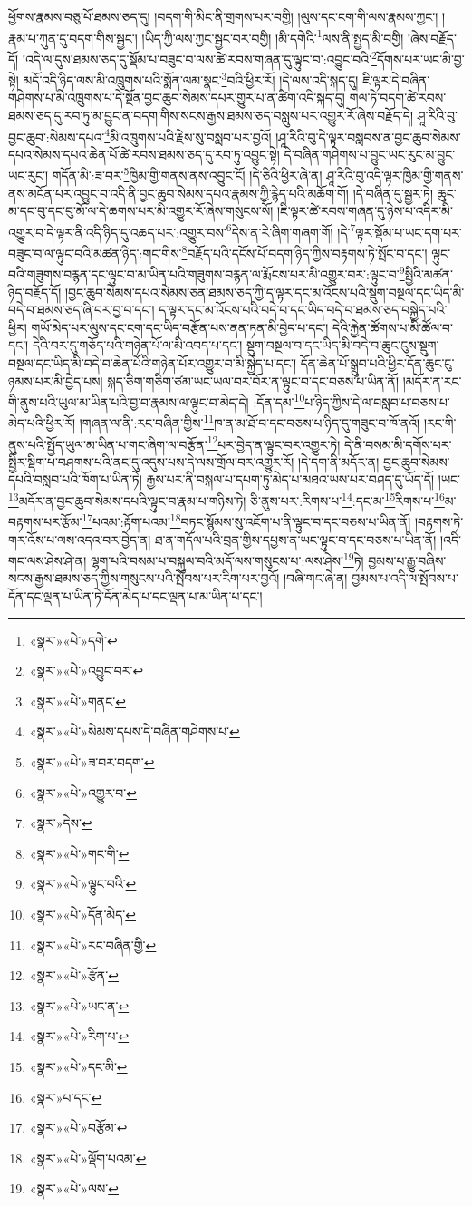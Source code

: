 ཕྱོགས་རྣམས་བཅུ་པོ་ཐམས་ཅད་དུ། །བདག་གི་མིང་ནི་གྲགས་པར་བགྱི། །ལུས་དང་ངག་གི་ལས་རྣམས་ཀྱང་། །རྣམ་པ་ཀུན་དུ་བདག་གིས་སྦྱང་། །ཡིད་ཀྱི་ལས་ཀྱང་སྦྱང་བར་བགྱི། །མི་དགེའི་\footnote{«སྣར་»«པེ་»དགེ་}ལས་ནི་སྤྱད་མི་བགྱི། །ཞེས་བརྗོད་དོ། །འདི་ལ་དུས་ཐམས་ཅད་དུ་སྡོམ་པ་བཟུང་བ་ལས་ཚེ་རབས་གཞན་དུ་ལྟུང་བ་:འབྱུང་བའི་\footnote{«སྣར་»«པེ་»འབྱུང་བར་}དོགས་པར་ཡང་མི་བྱ་སྟེ། མདོ་འདི་ཉིད་ལས་མི་འཁྲུགས་པའི་སྨོན་ལམ་སྣང་\footnote{«སྣར་»«པེ་»གནང་}བའི་ཕྱིར་རོ། །དེ་ལས་འདི་སྐད་དུ། ཇི་ལྟར་དེ་བཞིན་གཤེགས་པ་མི་འཁྲུགས་པ་དེ་སྔོན་བྱང་ཆུབ་སེམས་དཔར་གྱུར་པ་ན་ཚིག་འདི་སྐད་དུ། གལ་ཏེ་བདག་ཚེ་རབས་ཐམས་ཅད་དུ་རབ་ཏུ་མ་བྱུང་ན་བདག་གིས་སངས་རྒྱས་ཐམས་ཅད་བསླུས་པར་འགྱུར་རོ་ཞེས་བརྗོད་དེ། ཤཱ་རིའི་བུ་བྱང་ཆུབ་:སེམས་དཔའ་\footnote{«སྣར་»«པེ་»སེམས་དཔས་དེ་བཞིན་གཤེགས་པ་}མི་འཁྲུགས་པའི་རྗེས་སུ་བསླབ་པར་བྱའོ། །ཤཱ་རིའི་བུ་དེ་ལྟར་བསླབས་ན་བྱང་ཆུབ་སེམས་དཔའ་སེམས་དཔའ་ཆེན་པོ་ཚེ་རབས་ཐམས་ཅད་དུ་རབ་ཏུ་འབྱུང་སྟེ། དེ་བཞིན་གཤེགས་པ་བྱུང་ཡང་རུང་མ་བྱུང་ཡང་རུང་། གདོན་མི་:ཟ་བར་\footnote{«སྣར་»«པེ་»ཟ་བར་བདག་}ཁྱིམ་གྱི་གནས་ནས་འབྱུང་ངོ། །དེ་ཅིའི་ཕྱིར་ཞེ་ན། ཤཱ་རིའི་བུ་འདི་ལྟར་ཁྱིམ་གྱི་གནས་ནས་མངོན་པར་འབྱུང་བ་འདི་ནི་བྱང་ཆུབ་སེམས་དཔའ་རྣམས་ཀྱི་རྙེད་པའི་མཆོག་གོ། །དེ་བཞིན་དུ་སྦྱར་ཏེ། ཆུང་མ་དང་བུ་དང་བུ་མོ་ལ་དེ་ཆགས་པར་མི་འགྱུར་རོ་ཞེས་གསུངས་སོ། །ཇི་ལྟར་ཚེ་རབས་གཞན་དུ་ཉེས་པ་འདིར་མི་འགྱུར་བ་དེ་ལྟར་ནི་འདི་ཉིད་དུ་འཆད་པར་:འགྱུར་བས་\footnote{«སྣར་»«པེ་»འགྱུར་བ་}དེས་ན་རེ་ཞིག་གཞག་གོ། །དེ་\footnote{«སྣར་»དེས་}ལྟར་སྡོམ་པ་ཡང་དག་པར་བཟུང་བ་ལ་ལྟུང་བའི་མཚན་ཉིད་:གང་གིས་\footnote{«སྣར་»«པེ་»གང་གི་}བརྗོད་པའི་དངོས་པོ་བདག་ཉིད་ཀྱིས་བརྟགས་ཏེ་སྤོང་བ་དང་། ལྟུང་བའི་གཟུགས་བརྙན་དང་ལྟུང་བ་མ་ཡིན་པའི་གཟུགས་བརྙན་ལ་རྨོངས་པར་མི་འགྱུར་བར་:ལྟུང་བ་\footnote{«སྣར་»«པེ་»ལྟུང་བའི་}སྤྱིའི་མཚན་ཉིད་བརྗོད་དོ། །བྱང་ཆུབ་སེམས་དཔའ་སེམས་ཅན་ཐམས་ཅད་ཀྱི་ད་ལྟར་དང་མ་འོངས་པའི་སྡུག་བསྔལ་དང་ཡིད་མི་བདེ་བ་ཐམས་ཅད་ཞི་བར་བྱ་བ་དང་། ད་ལྟར་དང་མ་འོངས་པའི་བདེ་བ་དང་ཡིད་བདེ་བ་ཐམས་ཅད་བསྐྱེད་པའི་ཕྱིར། གཡོ་མེད་པར་ལུས་དང་ངག་དང་ཡིད་བརྩོན་པས་ནན་ཏན་མི་བྱེད་པ་དང་། དེའི་རྐྱེན་ཚོགས་པ་མི་ཚོལ་བ་དང་། དེའི་བར་དུ་གཅོད་པའི་གཉེན་པོ་ལ་མི་འབད་པ་དང་། སྡུག་བསྔལ་བ་དང་ཡིད་མི་བདེ་བ་ཆུང་ངུས་སྡུག་བསྔལ་དང་ཡིད་མི་བདེ་བ་ཆེན་པོའི་གཉེན་པོར་འགྱུར་བ་མི་སྐྱེད་པ་དང་། དོན་ཆེན་པོ་སྒྲུབ་པའི་ཕྱིར་དོན་ཆུང་ངུ་ཉམས་པར་མི་བྱེད་པས། སྐད་ཅིག་གཅིག་ཙམ་ཡང་ཡལ་བར་བོར་ན་ལྟུང་བ་དང་བཅས་པ་ཡིན་ནོ། །མདོར་ན་རང་གི་ནུས་པའི་ཡུལ་མ་ཡིན་པའི་བྱ་བ་རྣམས་ལ་ལྟུང་བ་མེད་དེ། :དོན་དམ་\footnote{«སྣར་»«པེ་»དོན་མེད་}པ་ཉིད་ཀྱིས་དེ་ལ་བསླབ་པ་བཅས་པ་མེད་པའི་ཕྱིར་རོ། །གཞན་ལ་ནི་:རང་བཞིན་གྱིས་\footnote{«སྣར་»«པེ་»རང་བཞིན་གྱི་}ཁ་ན་མ་ཐོ་བ་དང་བཅས་པ་ཉིད་དུ་གཟུང་བ་ཁོ་ནའོ། །རང་གི་ནུས་པའི་སྤྱོད་ཡུལ་མ་ཡིན་པ་གང་ཞིག་ལ་བརྩོན་\footnote{«སྣར་»«པེ་»རྩོན་}པར་བྱེད་ན་ལྟུང་བར་འགྱུར་ཏེ། དེ་ནི་བསམ་མི་དགོས་པར་སྤྱིར་སྡིག་པ་བཤགས་པའི་ནང་དུ་འདུས་པས་དེ་ལས་གྲོལ་བར་འགྱུར་རོ། །དེ་དག་ནི་མདོར་ན། བྱང་ཆུབ་སེམས་དཔའི་བསླབ་པའི་ཁོག་པ་ཡིན་ཏེ། རྒྱས་པར་ནི་བསྐལ་པ་དཔག་ཏུ་མེད་པ་མཐའ་ཡས་པར་བཤད་དུ་ཡོད་དོ། །ཡང་\footnote{«སྣར་»«པེ་»ཡང་ན་}མདོར་ན་བྱང་ཆུབ་སེམས་དཔའི་ལྟུང་བ་རྣམ་པ་གཉིས་ཏེ། ཅི་ནུས་པར་:རིགས་པ་\footnote{«སྣར་»«པེ་»རིག་པ་}:དང་མ་\footnote{«སྣར་»«པེ་»དང་མི་}རིགས་པ་\footnote{«སྣར་»པ་དང་}མ་བརྟགས་པར་རྩོམ་\footnote{«སྣར་»«པེ་»བརྩོམ་}པའམ་:རྟོག་པའམ་\footnote{«སྣར་»«པེ་»ལྡོག་པའམ་}བཏང་སྙོམས་སུ་འཇོག་པ་ནི་ལྟུང་བ་དང་བཅས་པ་ཡིན་ནོ། །བརྟགས་ཏེ་གར་འོས་པ་ལས་འདའ་བར་བྱེད་ན། ཐ་ན་གདོལ་པའི་བྲན་གྱིས་དཔྱས་ན་ཡང་ལྟུང་བ་དང་བཅས་པ་ཡིན་ནོ། །འདི་གང་ལས་ཤེས་ཤེ་ན། ལྷག་པའི་བསམ་པ་བསྐུལ་བའི་མདོ་ལས་གསུངས་པ་:ལས་ཤེས་\footnote{«སྣར་»«པེ་»ལས་}ཏེ། བྱམས་པ་རྒྱུ་བཞིས་སངས་རྒྱས་ཐམས་ཅད་ཀྱིས་གསུངས་པའི་སྤོབས་པར་རིག་པར་བྱའོ། །བཞི་གང་ཞེ་ན། བྱམས་པ་འདི་ལ་སྤོབས་པ་དོན་དང་ལྡན་པ་ཡིན་ཏེ་དོན་མེད་པ་དང་ལྡན་པ་མ་ཡིན་པ་དང་། 